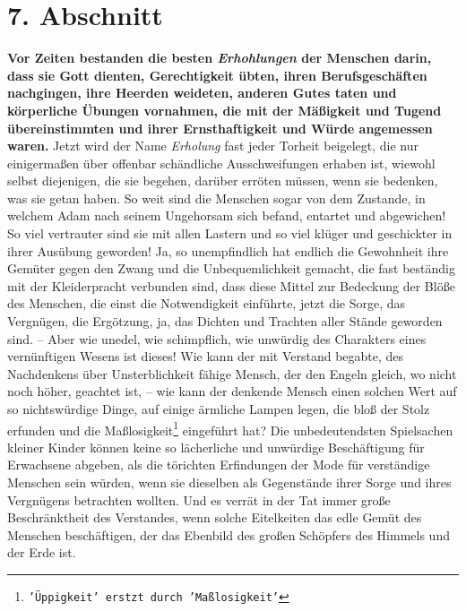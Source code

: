 \section{7. Abschnitt} \label{kap14_ab7}

\label{ref:14_07_wahre_nachfolger_erholung}
 \textbf{Vor Zeiten bestanden die 
besten \textit{Erhohlungen} der Menschen darin, dass sie Gott
dienten, Gerechtigkeit übten, ihren Berufsgeschäften nachgingen, ihre Heerden
weideten, anderen Gutes taten und körperliche Übungen vornahmen, die mit der
Mäßigkeit und Tugend übereinstimmten und ihrer Ernsthaftigkeit und Würde
angemessen waren.} Jetzt wird der Name \textit{Erholung} fast jeder Torheit
beigelegt, die nur einigermaßen über offenbar schändliche Ausschweifungen
erhaben ist, wiewohl selbst diejenigen, die sie begehen, darüber erröten
müssen, wenn sie bedenken, was sie getan haben. So weit sind die Menschen sogar
von dem Zustande, in welchem Adam nach seinem Ungehorsam sich befand, entartet
und abgewichen! So viel vertrauter sind sie mit allen Lastern und so viel klüger
und geschickter in ihrer Ausübung geworden! Ja, so unempfindlich hat endlich die
Gewohnheit ihre Gemüter gegen den Zwang und die Unbequemlichkeit gemacht, die
fast beständig mit der Kleiderpracht verbunden sind, dass diese Mittel zur
Bedeckung der Blöße des Menschen, die einst die Notwendigkeit einführte, jetzt
die Sorge, das Vergnügen, die Ergötzung, ja, das Dichten und Trachten aller
Stände geworden sind. -- Aber wie unedel, wie schimpflich, wie unwürdig des
Charakters eines vernünftigen Wesens ist dieses! Wie kann der mit Verstand
begabte, des Nachdenkens über Unsterblichkeit fähige Mensch, der den 
Engeln
gleich, wo nicht noch höher, geachtet ist, -- wie kann der denkende Mensch einen
solchen Wert auf so nichtswürdige Dinge, auf einige ärmliche Lampen legen, die
bloß der Stolz erfunden und die Maßlosigkeit\footnote{\texttt{'Üppigkeit' erstzt durch 'Maßlosigkeit'}} 
eingeführt hat? Die unbedeutendsten
Spielsachen kleiner Kinder können keine so lächerliche und unwürdige
Beschäftigung für Erwachsene abgeben, als die törichten Erfindungen der Mode
für verständige Menschen sein würden, wenn sie dieselben als Gegenstände ihrer
Sorge und ihres Vergnügens betrachten wollten. Und es verrät in der Tat immer
große Beschränktheit des Verstandes, wenn solche Eitelkeiten das edle Gemüt des
Menschen beschäftigen, der das Ebenbild des großen Schöpfers des Himmels und der
Erde ist.

